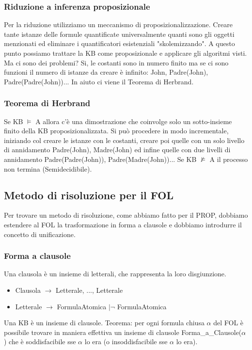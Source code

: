 \documentclass{article}
\begin{document}
\subsubsection{Riduzione a inferenza proposizionale}
Per la riduzione utilizziamo un meccanismo di proposizionalizzazione. Creare tante istanze delle formule quantificate universalmente quanti sono gli oggetti menzionati ed eliminare i quantificatori esistenziali "skolemizzando". A questo punto possiamo trattare la KB come proposizionale e applicare gli algoritmi visti. Ma ci sono dei problemi? Si, le costanti sono in numero finito ma se ci sono funzioni il numero di istanze da creare è infinito: John, Padre(John), Padre(Padre(John))... In aiuto ci viene il Teorema di Herbrand.

\subsubsection{Teorema di Herbrand} 
Se KB $\models$ A allora c'è una dimostrazione che coinvolge solo un sotto-insieme finito della KB proposizionalizzata. Si può procedere in modo incrementale, iniziando col creare le istanze con le costanti, creare poi quelle con un solo livello di annidamento Padre(John), Madre(John) ed infine quelle con due livelli di annidamento Padre(Padre(John)), Padre(Madre(John))... Se KB $\nvDash$ A il processo non termina (Semidecidibile).

\subsection{Metodo di risoluzione per il FOL}
Per trovare un metodo di risoluzione, come abbiamo fatto per il PROP, dobbiamo estendere al FOL la trasformazione in forma a clausole e dobbiamo introdurre il concetto di unificazione.

\subsubsection{Forma a clausole}
Una clausola è un insieme di letterali, che rappresenta la loro disgiunzione.
\begin{itemize}
    \item Clausola $\rightarrow$ {Letterale, ..., Letterale}
    \item Letterale $\rightarrow$ FormulaAtomica $| \neg$ FormulaAtomica
\end{itemize}
Una KB è un insieme di clausole.\newline
Teorema: per ogni formula chiusa $\alpha$ del FOL è possibile trovare in maniera effettiva un insieme di clausole Forma\_a\_Clausole($\alpha$) che è soddisfacibile sse $\alpha$ lo era (o insoddisfacibile sse $\alpha$ lo era). \clearpage
\end{document}
